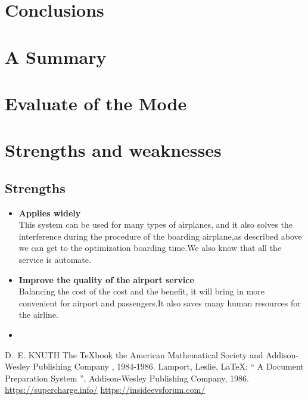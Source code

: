 \documentclass{mcmthesis}
\begin{document}
\section{Conclusions}


\section{A Summary}


\section{Evaluate of the Mode}

\section{Strengths and weaknesses}


\subsection{Strengths}
\begin{itemize}
\item \textbf{Applies widely}\\
This  system can be used for many types of airplanes, and it also
solves the interference during  the procedure of the boarding
airplane,as described above we can get to the  optimization
boarding time.We also know that all the service is automate.
\item \textbf{Improve the quality of the airport service}\\
Balancing the cost of the cost and the benefit, it will bring in
more convenient  for airport and passengers.It also saves many
human resources for the airline. 
\item \textbf{}
\end{itemize}

\begin{thebibliography}{99}
 D.~E. KNUTH   The \TeX{}book  the American
Mathematical Society and Addison-Wesley
Publishing Company , 1984-1986.
Lamport, Leslie,  \LaTeX{}: `` A Document Preparation System '',
Addison-Wesley Publishing Company, 1986.
\url{https://supercharge.info/}
\url{https://insideevsforum.com/}
\end{thebibliography}
\end{document}
